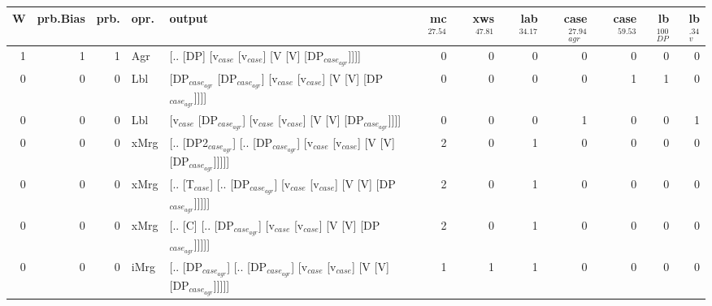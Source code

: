 \begin{tabularx}{\linewidth}{rrrlXrrrrrrr}
\hline
   W &   prb.Bias &   prb. & opr.   & output                                                                                                  &   mc$^{27.54}$ &   xws$^{47.81}$ &   lab$^{34.17}$ &   case$_{agr}^{27.94}$ &   case$^{59.53}$ &   lb$_{DP}^{100}$ &   lb$_{v}^{.34}$ \\
\hline
   1 &       1 &   1 & Agr  & [.. [DP] [v$_{case}$ [v$_{case}$] [V [V] [DP$_{case_{agr}}$]]]]                                                       &            0 &             0 &             0 &                  0 &              0 &                0 &             0 \\
   0 &       0 &   0 & Lbl  & [DP$_{case_{agr}}$ [DP$_{case_{agr}}$] [v$_{case}$ [v$_{case}$] [V [V] [DP$_{case_{agr}}$]]]]                                     &            0 &             0 &             0 &                  0 &              1 &                1 &             0 \\
   0 &       0 &   0 & Lbl  & [v$_{case}$ [DP$_{case_{agr}}$] [v$_{case}$ [v$_{case}$] [V [V] [DP$_{case_{agr}}$]]]]                                          &            0 &             0 &             0 &                  1 &              0 &                0 &             1 \\
   0 &       0 &   0 & xMrg & [.. [DP2$_{case_{agr}}$] [.. [DP$_{case_{agr}}$] [v$_{case}$ [v$_{case}$] [V [V] [DP$_{case_{agr}}$]]]]]                          &            2 &             0 &             1 &                  0 &              0 &                0 &             0 \\
   0 &       0 &   0 & xMrg & [.. [T$_{case}$] [.. [DP$_{case_{agr}}$] [v$_{case}$ [v$_{case}$] [V [V] [DP$_{case_{agr}}$]]]]]                                &            2 &             0 &             1 &                  0 &              0 &                0 &             0 \\
   0 &       0 &   0 & xMrg & [.. [C] [.. [DP$_{case_{agr}}$] [v$_{case}$ [v$_{case}$] [V [V] [DP$_{case_{agr}}$]]]]]                                     &            2 &             0 &             1 &                  0 &              0 &                0 &             0 \\
   0 &       0 &   0 & iMrg & [.. [DP$_{case_{agr}}$] [.. [DP$_{case_{agr}}$] [v$_{case}$ [v$_{case}$] [V [V] [DP$_{case_{agr}}$]]]]]                           &            1 &             1 &             1 &                  0 &              0 &                0 &             0 \\

\end{tabularx}
